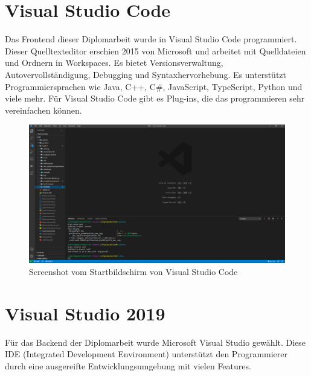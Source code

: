\section{Visual Studio Code}
Das Frontend dieser Diplomarbeit wurde in Visual Studio Code programmiert. Dieser Quelltexteditor erschien 2015 von Microsoft und arbeitet mit Quelldateien und Ordnern in Workspaces. Es bietet Versionsverwaltung, Autovervollständigung, Debugging und Syntaxhervorhebung. Es unterstützt Programmiersprachen wie Java, C++, C\#, JavaScript, TypeScript, Python und viele mehr. Für Visual Studio Code gibt es Plug-ins, die das programmieren sehr vereinfachen können. \autocite{wikiVisualStudioCode}

\begin{figure}[H]
	\centerline{
		\includegraphics[width=1\textwidth, frame]{./grafiken/vs_code_startbildschirm.PNG}
	}
	\vskip0pt
	\caption{Screenshot vom Startbildschirm von Visual Studio Code} \label{fig:visualStudioCodeStartview}
\end{figure}

\section{Visual Studio 2019}

Für das Backend der Diplomarbeit wurde Microsoft Visual Studio gewählt. Diese IDE (Integrated Development Environment) unterstützt den Programmierer durch eine ausgereifte Entwicklungsumgebung mit vielen Features.\\

